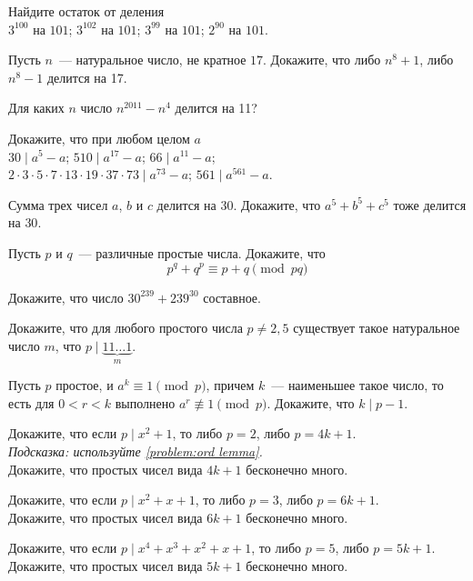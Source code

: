 \begin{problems}

\item
Найдите остаток от деления
\\
\sbp $3^{100}$ на $101$;
\quad
\sbp $3^{102}$ на $101$;
\quad
\sbp $3^{99}$ на $101$;
\quad
\sbp $2^{90}$ на $101$.

\item
Пусть $n$~--- натуральное число, не кратное $17$.
Докажите, что либо $n^8 + 1$, либо $n^8 - 1$ делится на 17.

\item
Для каких $n$ число $n^{2011} - n^{4}$ делится на 11?

\item
Докажите, что при любом целом $a$
\\
\sbp $30 \mid a^5 - a$;
\quad
\sbp $510 \mid a^{17} - a$;
\quad
\sbp $66 \mid a^{11} - a$;
\\
\sbp
\(
    2 \cdot 3 \cdot 5 \cdot 7
    \cdot
    13 \cdot 19 \cdot 37 \cdot 73
\mid
    a^{73} - a
\);
\sbp $561 \mid a^{561} - a$.

\item
Сумма трех чисел $a$, $b$ и $c$ делится на 30.
Докажите, что $a^5 + b^5 + c^5$ тоже делится на $30$.

\item
Пусть $p$ и $q$~--- различные простые числа.
Докажите, что
\[
    p^q + q^p \equiv p + q \pmod{pq}
\]

\item
Докажите, что число $30^{239} + 239^{30}$ составное.

\item
Докажите, что для любого простого числа $p \neq 2, 5$ существует такое
натуральное число $m$, что
\(
    p
\mid
    \underbrace{11\ldots1}_{m}
\).

\item\label{problem:ord lemma}%
Пусть $p$ простое, и
$a^k \equiv 1 \pmod p$, причем $k$~--- наименьшее такое число, то есть для
$0 < r < k$ выполнено $a^r \not\equiv 1 \pmod p$.
Докажите, что $k \mid p - 1$.

\item
\sbp
Докажите, что если $p \mid x^2 + 1$, то либо $p = 2$, либо $p = 4 k + 1$.
\\
\emph{Подсказка: используйте \ref{problem:ord lemma}.}
\\
\sbp
Докажите, что простых чисел вида $4 k + 1$ бесконечно много.

\item
\sbp
Докажите, что если $p \mid x^2 + x + 1$, то либо $p = 3$, либо $p = 6 k + 1$.
\\
\sbp
Докажите, что простых чисел вида $6 k + 1$ бесконечно много.

\item
\sbp
Докажите, что если $p \mid x^4 + x^3 + x^2 + x + 1$, то либо $p = 5$, либо
$p = 5 k + 1$.
\\
\sbp
Докажите, что простых чисел вида $5 k + 1$ бесконечно много.

\end{problems}


